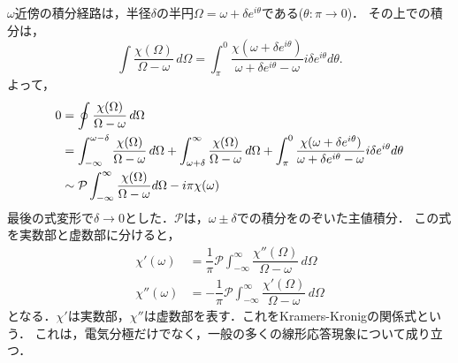 $\omega$近傍の積分経路は，半径$\delta$の半円$\Omega = \omega + \delta e^{i\theta}$である($\theta \colon \pi \to 0$)．
その上での積分は，
\[ \int \dfrac{\chi(\Omega)}{\Omega - \omega} \, d\Omega = \int^0_\pi \dfrac{\chi (\omega + \delta e^{i\theta})}{\omega+\delta e^{i\theta} - \omega} i\delta e^{i\theta}d\theta . \]
よって，
\begin{align}
  0 &= \oint \dfrac{\chi(\Omega)}{\Omega - \omega} \, d\Omega\notag \\
  &= \int_{-\infty}^{\omega-\delta} \dfrac{\chi(\Omega)}{\Omega - \omega} \, d\Omega
  + \int_{\omega+\delta}^{\infty} \dfrac{\chi(\Omega)}{\Omega - \omega} \, d\Omega
  + \int^0_\pi \dfrac{\chi (\omega + \delta e^{i\theta})}{\omega+\delta e^{i\theta} - \omega} i\delta e^{i\theta}d\theta \notag \\
  &\sim \mathcal{P}\int^\infty_{ - \infty}\dfrac{\chi(\Omega)}{\Omega - \omega}d\Omega  -  i\pi\chi(\omega)
  \label{kra_kro_int}
\end{align}
最後の式変形で$\delta \to 0$とした．$\mathcal{P}$は，$\omega\pm\delta$での積分をのぞいた主値積分．
この式を実数部と虚数部に分けると，
\begin{align}
  \chi'(\omega) &= \dfrac{1}{\pi}\mathcal{P}\int^\infty_{ - \infty}\dfrac{\chi''(\Omega)}{\Omega - \omega} \, d\Omega \label{kra_kro_real} \\
  \chi''(\omega) &=  - \dfrac{1}{\pi}\mathcal{P}\int^\infty_{ - \infty}\dfrac{\chi'(\Omega)}{\Omega - \omega} \, d\Omega \label{kra_kro_imaginary}
\end{align}
となる．$\chi'$は実数部，$\chi''$は虚数部を表す．これをKramers-Kronigの関係式という．
これは，電気分極だけでなく，一般の多くの線形応答現象について成り立つ．

